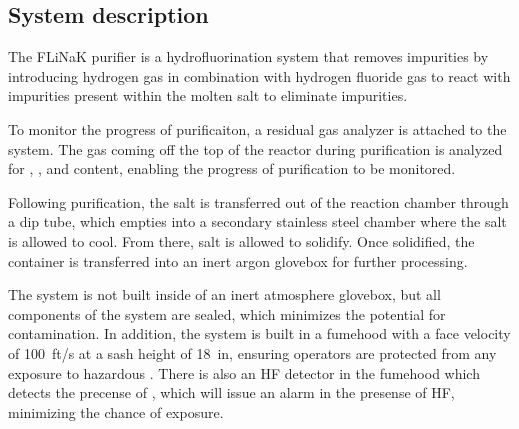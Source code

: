 %
%

\subsection{System description}

The FLiNaK purifier is a hydrofluorination system that removes impurities by
introducing hydrogen gas in combination with hydrogen fluoride gas to react with
impurities present within the molten salt to eliminate impurities. \par

To monitor the progress of purificaiton, a residual gas analyzer is attached
to the system. The gas coming off the top of the reactor during purification is
analyzed for , , and  content, enabling the progress of
purification to be monitored. \par

Following purification, the salt is transferred out of the reaction chamber
through a dip tube, which empties into a secondary stainless steel chamber
where the salt is allowed to cool. From there, salt is allowed to solidify.
Once solidified, the container is transferred into an inert argon glovebox
for further processing. \par

The system is not built inside of an inert atmosphere glovebox, but all
components of the system are sealed, which minimizes the potential for
contamination. In addition, the system is built in a fumehood with a
face velocity of \SI{100}{ft/s} at a sash height of \SI{18}{in},
ensuring operators are protected from any exposure to hazardous .
There is also an HF detector in the fumehood which detects the precense of
, which will issue an alarm in the presense of HF, minimizing the
chance of exposure. \par
